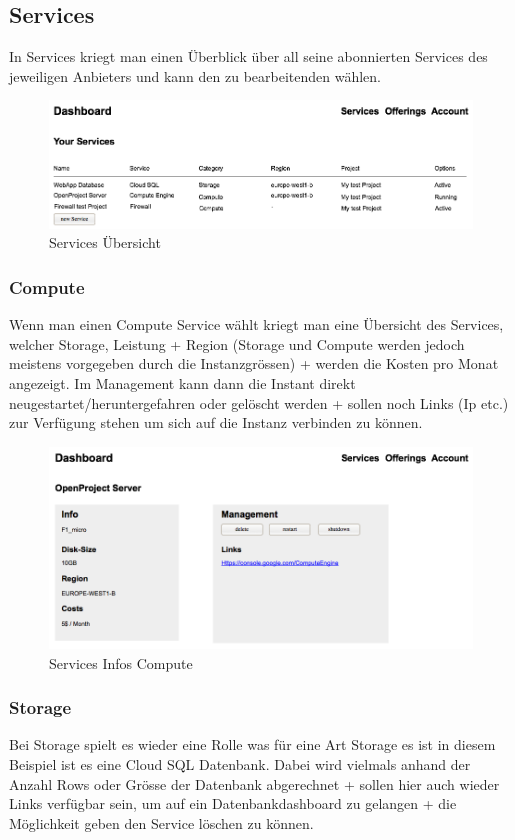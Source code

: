 \subsection{Services}
In Services kriegt man einen Überblick über all seine abonnierten Services des jeweiligen 
Anbieters und kann den zu bearbeitenden wählen.
\begin{figure}[!htbp]
\includegraphics[width=\textwidth]{./03_Analyse/03_Dashboard/images/services_overview}
\caption{Services Übersicht}
\end{figure}

\newpage
\subsubsection{Compute}
Wenn man einen Compute Service wählt kriegt man eine Übersicht des Services, 
welcher Storage, Leistung + Region (Storage und Compute werden jedoch 
meistens vorgegeben durch die Instanzgrössen) + werden die Kosten pro 
Monat angezeigt.
Im Management kann dann die Instant direkt neugestartet/heruntergefahren oder gelöscht 
werden + sollen noch Links (Ip etc.) zur Verfügung stehen um sich auf die Instanz 
 verbinden zu können.
 
\begin{figure}[!htbp]
\includegraphics[width=\textwidth]{./03_Analyse/03_Dashboard/images/service_info_compute}
\caption{Services Infos Compute}
\end{figure}

\subsubsection{Storage}
Bei Storage spielt es wieder eine Rolle was für eine Art Storage es ist in 
diesem Beispiel ist es eine Cloud SQL Datenbank.
Dabei wird vielmals anhand der Anzahl Rows oder Grösse der Datenbank abgerechnet 
+ sollen hier auch wieder Links verfügbar sein, um auf ein Datenbankdashboard zu 
gelangen + die Möglichkeit geben den Service löschen zu können.

